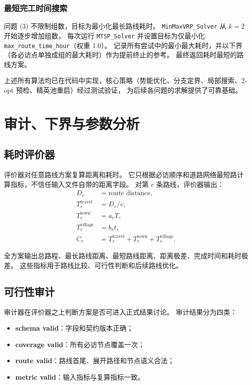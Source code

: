 \documentclass[a4paper, 12pt]{article}
\begin{document}
\subsubsection{最短完工时间搜索}

问题 (3) 不限制组数，目标为最小化最长路线耗时。
\texttt{MinMaxVRP\_Solver} 从 $k=2$ 开始逐步增加组数，
每次运行 \texttt{MTSP\_Solver} 并设置目标为仅最小化 \texttt{max\_route\_time\_hour}（权重 1.0）。
记录所有尝试中的最小最大耗时，并以下界（各必访点单独成组的最大耗时）作为提前终止的参考。
最终返回耗时最短的路线方案。

上述所有算法均已在代码中实现，核心策略（势能优化、分支定界、局部搜索、2-opt 预检、精英池重启）经过测试验证，
为后续各问题的求解提供了可靠基础。

\section{审计、下界与参数分析}

\subsection{耗时评价器}

评价器对任意路线方案复算距离和耗时。
它只根据必访顺序和道路网络最短路计算指标，不信任输入文件自带的距离字段。
对第 $r$ 条路线，评价器输出：
\begin{equation}
\begin{aligned}
    D_r &= \text{route distance},\\
    T^{\text{travel}}_r &= D_r/v,\\
    T^{\text{town}}_r &= a_rT,\\
    T^{\text{village}}_r &= b_rt,\\
    C_r &= T^{\text{travel}}_r+T^{\text{town}}_r+T^{\text{village}}_r.
\end{aligned}
\end{equation}

全方案输出总路程、最长路线距离、最短路线距离、距离极差、完成时间和耗时极差。
这些指标用于路线比较、可行性判断和后续路线优化。

\subsection{可行性审计}

审计器在评价器之上判断方案是否可进入正式结果讨论。
审计结果分为四类：
\begin{itemize}[leftmargin=2em]
    \item \textbf{schema valid}：字段和契约版本正确；
    \item \textbf{coverage valid}：所有必访节点覆盖一次；
    \item \textbf{route valid}：路线首尾、展开路径和节点语义合法；
    \item \textbf{metric valid}：输入指标与复算指标一致。
\end{itemize}
\end{document}
